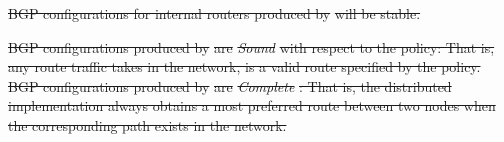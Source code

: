\documentclass[10pt]{sigalternate052015} %
\newcommand{\sysname}{{\small \sf Propane}\xspace}
\providecommand{\DIFdel}[1]{{\protect\color{red}\sout{#1}}}                      %
\providecommand{\DIFdelbegin}{} %
\providecommand{\DIFdelend}{} %
\begin{document}
\DIFdelend %
\DIFdelbegin %

\DIFdel{BGP configurations for internal routers produced by }%
\DIFdel{will be stable. 
}%

\DIFdel{BGP configurations produced by }%
\DIFdel{are }\textit{\DIFdel{Sound}} %
\DIFdel{with respect to the policy: That is, any route traffic takes in the network, is a valid route specified by the policy.
}%
\DIFdelend %
%
\DIFdelbegin %
\DIFdel{BGP configurations produced by }%
\DIFdel{are }\textit{\DIFdel{Complete}}%
\DIFdel{: That is, the distributed implementation always obtains a most preferred route between two nodes when the corresponding path exists in the network.
}%
\DIFdelend %
\end{document}
